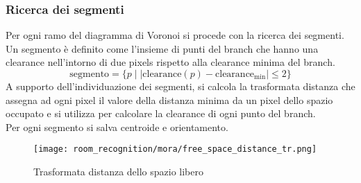 \subsubsection{Ricerca dei segmenti}
Per ogni ramo del diagramma di Voronoi si procede con la ricerca dei segmenti. \\
Un segmento è definito come l'insieme di punti del branch che hanno una clearance nell'intorno di due pixels rispetto alla clearance minima del branch.
\begin{equation}
  \text{segmento} = \{p \mid | \text{clearance}(p) - \text{clearance}_{\text{min}} | \leq 2\}
\end{equation}
A supporto dell'individuazione dei segmenti, si calcola la trasformata distanza che assegna ad ogni pixel il valore della distanza minima da un pixel dello spazio occupato e si utilizza per calcolare la clearance di ogni punto del branch.\\Per ogni segmento si salva centroide e orientamento.
\begin{figure}[H]
  \centering
  \texttt{[image: room\_recognition/mora/free\_space\_distance\_tr.png]}
  \caption{Trasformata distanza dello spazio libero}
\end{figure}
